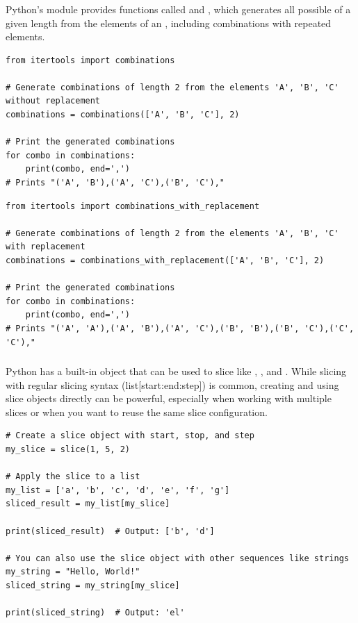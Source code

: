 \subsubsection{}

Python's  module provides functions called  and , which generates all possible  of a given length from the elements of an , including combinations with repeated elements.
\begin{lstlisting}
from itertools import combinations

# Generate combinations of length 2 from the elements 'A', 'B', 'C' without replacement
combinations = combinations(['A', 'B', 'C'], 2)

# Print the generated combinations
for combo in combinations:
    print(combo, end=',')
# Prints "('A', 'B'),('A', 'C'),('B', 'C'),"
\end{lstlisting}
\begin{lstlisting}
from itertools import combinations_with_replacement

# Generate combinations of length 2 from the elements 'A', 'B', 'C' with replacement
combinations = combinations_with_replacement(['A', 'B', 'C'], 2)

# Print the generated combinations
for combo in combinations:
    print(combo, end=',')
# Prints "('A', 'A'),('A', 'B'),('A', 'C'),('B', 'B'),('B', 'C'),('C', 'C'),"
\end{lstlisting}











\subsubsection{}

Python has a built-in  object that can be used to slice  like , , and . While slicing with regular slicing syntax (list[start:end:step]) is common, creating and using slice objects directly can be powerful, especially when working with multiple slices or when you want to reuse the same slice configuration.
\begin{lstlisting}
# Create a slice object with start, stop, and step
my_slice = slice(1, 5, 2)

# Apply the slice to a list
my_list = ['a', 'b', 'c', 'd', 'e', 'f', 'g']
sliced_result = my_list[my_slice]

print(sliced_result)  # Output: ['b', 'd']

# You can also use the slice object with other sequences like strings
my_string = "Hello, World!"
sliced_string = my_string[my_slice]

print(sliced_string)  # Output: 'el'
\end{lstlisting}

